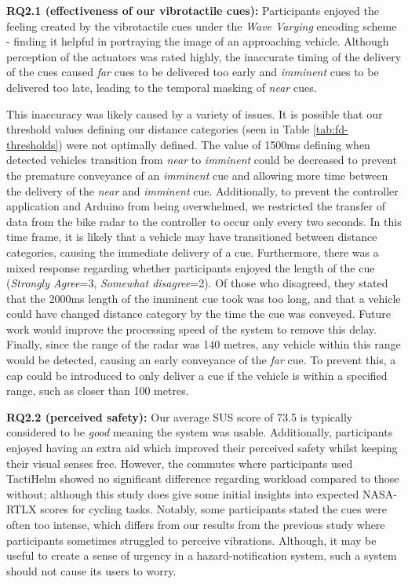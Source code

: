 \documentclass{mpaper}
\begin{document}
\textbf{RQ2.1 (effectiveness of our vibrotactile cues):} Participants enjoyed the feeling created by the vibrotactile cues under the \textit{Wave Varying} encoding scheme - finding it helpful in portraying the image of an approaching vehicle. Although perception of the actuators was rated highly, the inaccurate timing of the delivery of the cues caused \textit{far} cues to be delivered too early and \textit{imminent} cues to be delivered too late, leading to the temporal masking of \textit{near} cues. 

This inaccuracy was likely caused by a variety of issues. It is possible that our threshold values defining our distance categories (seen in Table \ref{tab:fd-thresholds}) were not optimally defined. The value of 1500ms defining when detected vehicles transition from \textit{near} to \textit{imminent} could be decreased to prevent the premature conveyance of an \textit{imminent} cue and allowing more time between the delivery of the \textit{near} and \textit{imminent} cue. Additionally, to prevent the controller application and Arduino from being overwhelmed, we restricted the transfer of data from the bike radar to the controller to occur only every two seconds. In this time frame, it is likely that a vehicle may have transitioned between distance categories, causing the immediate delivery of a cue. Furthermore, there was a mixed response regarding whether participants enjoyed the length of the cue (\textit{Strongly Agree}=3, \textit{Somewhat disagree}=2). Of those who disagreed, they stated that the 2000ms length of the imminent cue took was too long, and that a vehicle could have changed distance category by the time the cue was conveyed. Future work would improve the processing speed of the system to remove this delay. Finally, since the range of the radar was 140 metres, any vehicle within this range would be detected, causing an early conveyance of the \textit{far} cue. To prevent this, a cap could be introduced to only deliver a cue if the vehicle is within a specified range, such as closer than 100 metres.

\textbf{RQ2.2 (perceived safety):} Our average SUS score of 73.5 is typically considered to be \textit{good} \cite{10.5555/2835587.2835589} meaning the system was usable. Additionally, participants enjoyed having an extra aid which improved their perceived safety whilst keeping their visual senses free. However, the commutes where participants used TactiHelm showed no significant difference regarding workload compared to those without; although this study does give some initial insights into expected NASA-RTLX scores for cycling tasks. Notably, some participants stated the cues were often too intense, which differs from our results from the previous study where participants sometimes struggled to perceive vibrations. Although, it may be useful to create a sense of urgency in a hazard-notification system, such a system should not cause its users to worry.
\end{document}
